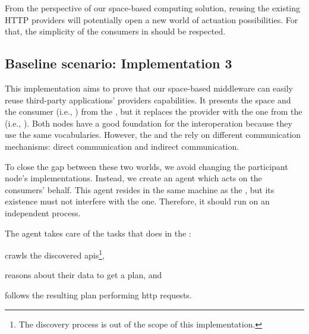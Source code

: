 From the perspective of our space-based computing solution, reusing the existing HTTP providers will potentially open a new world of actuation possibilities.
For that, the simplicity of the consumers in \spaceActuation{} should be respected. %




\subsection{Baseline scenario: Implementation 3}
\label{sec:actuation_scn3}
\newcommand{\implMix}{\emph{Implementation 3}}

This implementation aims to prove that our space-based middleware can easily reuse third-party applications' providers capabilities. %
It presents the space and the consumer (i.e., \nodeConsSpace{}) from the \implSpace{}, but it replaces the provider with the one from the \implRest{} (i.e., \nodeProvRest{}).
Both nodes have a good foundation for the interoperation because they use the same vocabularies. %
However, the \nodeProvRest{} and the \nodeConsSpace{} rely on different communication mechanisms: direct communication and indirect communication.


To close the gap between these two worlds, we avoid changing the participant node's implementations.
Instead, we create an agent which acts on the consumers' behalf. %
This agent resides in the same machine as the \Space{}, but its existence must not interfere with the \Space{} one. %
Therefore, it should run on an independent process.


The agent takes care of the tasks that \nodeConsRest{} does in the \implRest:
\begin{enumerate*}[label=\itshape(\arabic*\upshape)]
  \item crawls the discovered \acsp{api}\footnote{The discovery process is out of the scope of this implementation.},
  \item reasons about their data to get a plan, and
  \item follows the resulting plan performing \acs{http} requests.
\end{enumerate*}


